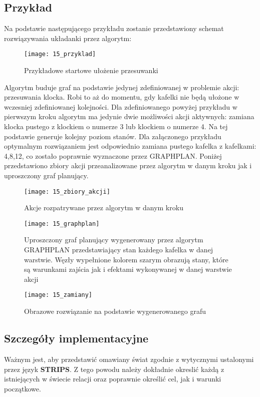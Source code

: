     \subsection{Przykład}
        Na podstawie następującego przykładu zostanie przedstawiony schemat rozwiązywania układanki przez algorytm:
        \begin{figure}[H]
            \texttt{[image: 15\_przyklad]}
            \centering
            \caption{Przykładowe startowe ułożenie przesuwanki}
        \end{figure}
        Algorytm buduje graf na podstawie jedynej zdefiniowanej w problemie akcji: przesuwania klocka. Robi to aż do momentu, gdy kafelki nie 
        będą ułożone w wczesniej zdefiniowanej kolejności. Dla zdefiniowanego powyżej przykładu w pierwszym kroku algorytm ma jedynie dwie możliwości 
        akcji aktywnych: zamiana klocka pustego z klockiem o numerze 3 lub klockiem o numerze 4. Na tej podstawie generuje kolejny poziom stanów. 
        Dla załączonego przykładu optymalnym rozwiązaniem jest odpowiednio zamiana pustego kafelka z kafelkami: 4,8,12, co zostało poprawnie 
        wyznaczone przez GRAPHPLAN. Poniżej przedstawiono zbiory akcji przeanalizowane przez algorytm w danym kroku jak i uproszczony graf planujący.

        \begin{figure}[H]
            \texttt{[image: 15\_zbiory\_akcji]}
            \centering
            \caption{Akcje rozpatrywane przez algorytm w danym kroku}
        \end{figure}

        \begin{figure}[H]
            \texttt{[image: 15\_graphplan]}
            \centering
            \caption{Uproszczony graf planujący wygenerowany przez algorytm GRAPHPLAN przedstawiający stan każdego kafelka w danej warstwie. Węzły wypełnione 
            kolorem szarym obrazują stany, które są warunkami zajścia jak i efektami wykonywanej w danej warstwie akcji}
        \end{figure}

        \begin{figure}[H]
            \texttt{[image: 15\_zamiany]}
            \centering
            \caption{Obrazowe rozwiązanie na podstawie wygenerowanego grafu}
        \end{figure}





    \subsection{Szczegóły implementacyjne}
    Ważnym jest, aby przedstawić omawiany świat zgodnie z wytycznymi ustalonymi przez język \textbf{STRIPS}. Z tego powodu należy dokładnie okreslić 
    każdą z istniejących w świecie relacji oraz poprawnie określić cel, jak i warunki początkowe.

